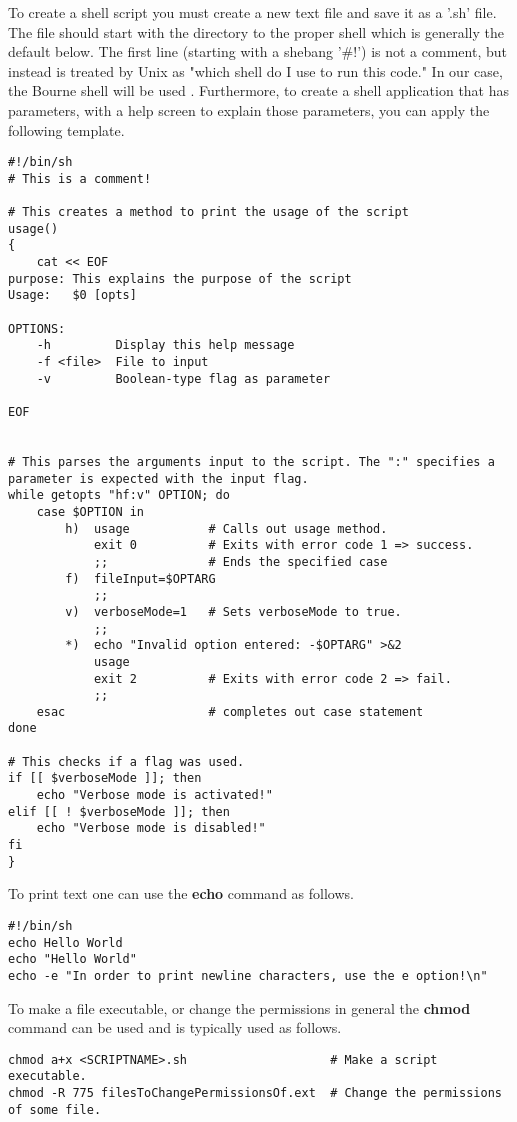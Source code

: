 To create a shell script you must create a new text file and save it as a '.sh' file. The file should start with the directory to the proper shell which is generally the default below. The first line (starting with a shebang '\#!') is not a comment, but instead is treated by Unix as "which shell do I use to run this code." In our case, the Bourne shell will be used \cite{linux: shell scripting}. Furthermore, to create a shell application that has parameters, with a help screen to explain those parameters, you can apply the following template.
\begin{lstlisting}
#!/bin/sh
# This is a comment!

# This creates a method to print the usage of the script
usage()
{
	cat << EOF
purpose: This explains the purpose of the script
Usage:   $0 [opts]

OPTIONS:
	-h         Display this help message
	-f <file>  File to input
	-v         Boolean-type flag as parameter
	
EOF


# This parses the arguments input to the script. The ":" specifies a parameter is expected with the input flag.
while getopts "hf:v" OPTION; do
	case $OPTION in
		h)	usage			# Calls out usage method.
			exit 0			# Exits with error code 1 => success.
			;;				# Ends the specified case
		f)	fileInput=$OPTARG
			;;
		v)	verboseMode=1	# Sets verboseMode to true.
			;;
		*)	echo "Invalid option entered: -$OPTARG" >&2
			usage
			exit 2			# Exits with error code 2 => fail.
			;;
	esac					# completes out case statement
done

# This checks if a flag was used.
if [[ $verboseMode ]]; then
	echo "Verbose mode is activated!"
elif [[ ! $verboseMode ]]; then
	echo "Verbose mode is disabled!"
fi
}
\end{lstlisting}

To print text one can use the \textbf{echo} command as follows.
\begin{lstlisting}
#!/bin/sh
echo Hello World
echo "Hello World"
echo -e "In order to print newline characters, use the e option!\n"
\end{lstlisting}

To make a file executable, or change the permissions in general the \textbf{chmod} command can be used and is typically used as follows.
\begin{lstlisting}
chmod a+x <SCRIPTNAME>.sh					 # Make a script executable.
chmod -R 775 filesToChangePermissionsOf.ext  # Change the permissions of some file.
\end{lstlisting}

